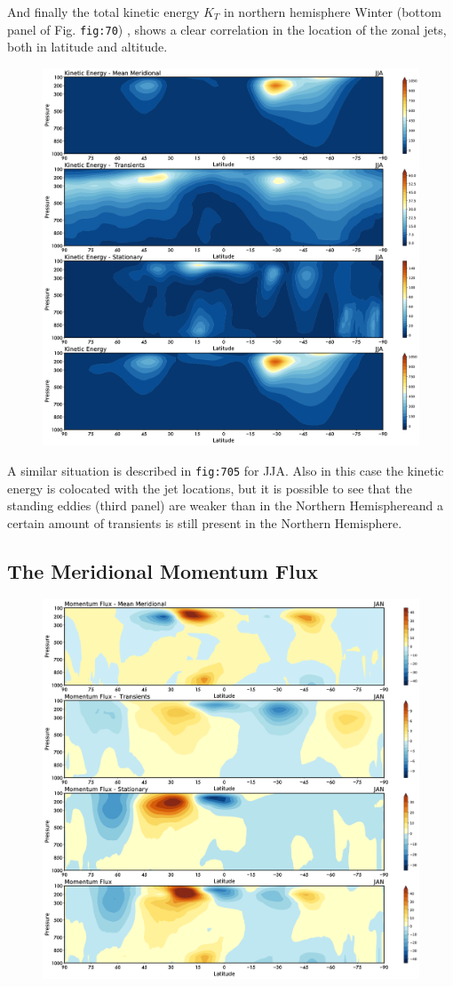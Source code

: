 And finally the total kinetic energy \(K_T\) in northern hemisphere
Winter (bottom panel of Fig. \texttt{fig:70}) , shows a clear
correlation in the location of the zonal jets, both in latitude and
altitude.

\begin{figure}
\centering
\includegraphics[width = .7 \textwidth]{figs/GD/JJAKEFlux.png}
\caption{}\label{}
\end{figure}

A similar situation is described in \texttt{fig:705} for JJA. Also in
this case the kinetic energy is colocated with the jet locations, but it
is possible to see that the standing eddies (third panel) are weaker
than in the Northern Hemisphereand a certain amount of transients is
still present in the Northern Hemisphere.

\subsection{The Meridional Momentum
Flux}\label{the-meridional-momentum-flux}

\begin{figure}
\centering
\includegraphics[width = .7 \textwidth]{figs/GD/JANUVFlux.png}
\caption{}\label{}
\end{figure}

